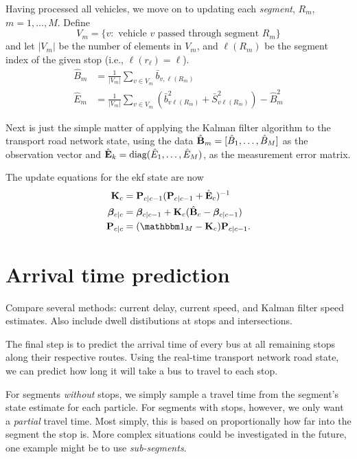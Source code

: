 \documentclass[draftcls,a4paper,onecolumn]{IEEEtran}\usepackage[]{graphicx}\usepackage[]{color}
\begin{document}
Having processed all vehicles, we move on to updating each \emph{segment},
$R_m$, $m = 1, \ldots, M$.
Define
\begin{equation*}
  V_m = \{v:\text{ vehicle $v$ passed through segment } R_m\}
\end{equation*}
and let $|V_m|$ be the number of elements in $V_m$,
and $\ell(R_m)$ be the segment index of the given stop
(i.e., $\ell(r_\ell) = \ell$).
\begin{align}
  \label{eq:kf_data_estimates}
  \hat B_m &= \frac{1}{|V_m|} \sum_{v \in V_m} \bar b_{v,\ell(R_m)}  \\
  \hat E_m &= \frac{1}{|V_m|} \sum_{v \in V_m} 
  \left(\bar b_{v\ell(R_m)}^2 + \bar S_{v\ell(R_m)}^2\right) - \hat B_m^2
\end{align}

Next is just the simple matter of applying the Kalman filter algorithm 
\cite{Anderson_2012} 
to the transport road network state,
using the data \mbox{$\hat {\mathbf{B}}_m = [\hat B_1, \ldots, \hat B_M]$} 
as the observation vector
and \mbox{$\hat {\mathbf{E}}_k = \textrm{diag}(\hat E_1, \ldots, \hat E_M)$},
as the measurement error matrix.

The update equations for the \gls{ekf} state are now
\begin{align}
  \bK_c &= \bP_{c|c-1}(\bP_{c|c-1} + \hat {\mat E}_c)^{-1} \\
  \bbeta_{c|c} &= \bbeta_{c|c-1} + \bK_c(\hat {\mat B}_c - \bbeta_{c|c-1}) \\
  \bP_{c|c} &= (\eye_M - \bK_c) \bP_{c|c-1}.
\end{align}



\section{Arrival time prediction}
\label{sec:arrival_time}


Compare several methods:
current delay, current speed, and Kalman filter speed estimates.
Also include dwell distibutions at stops and intersections.


The final step is to predict the arrival time of every bus 
at all remaining stops along their respective routes.
Using the real-time transport network road state, 
we can predict how long it will take a bus to travel 
to each stop.


For segments \emph{without} stops,
we simply sample a travel time from the segment's state estimate
for each particle.
For segments with stops, however,
we only want a \emph{partial} travel time.
Most simply, this is based on proportionally how far into the segment
the stop is.
More complex situations could be investigated in the future,
one example might be to use \emph{sub-segments}.
\end{document}
